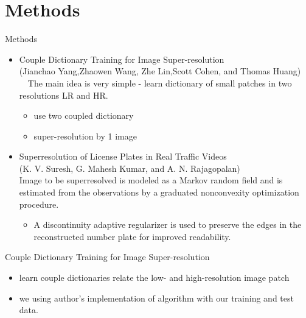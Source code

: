 \section{Methods}
\begin{frame}{Methods}
  \begin{itemize}
    \item Couple Dictionary Training for Image Super-resolution \\
        (Jianchao Yang,Zhaowen Wang, Zhe Lin,Scott Cohen, and Thomas Huang) \\
  The main idea is very simple - learn dictionary of small patches in two resolutions LR and HR.
      \begin{itemize}
        \item use two coupled dictionary
        \item super-resolution by 1 image
      \end{itemize}
    \item Superresolution of License Plates in Real Traffic Videos \\
      (K. V. Suresh, G. Mahesh Kumar, and A. N. Rajagopalan) \\
      Image to be superresolved is modeled as a Markov random field and is estimated from the observations by a graduated
nonconvexity optimization procedure.
      \begin{itemize}
        \item A discontinuity adaptive regularizer is used to preserve the
edges in the reconstructed number plate for improved readability.
      \end{itemize}
  \end{itemize}
\end{frame}

\begin{frame}{Couple Dictionary Training for Image Super-resolution}
  \begin{itemize}
    \item learn couple dictionaries relate the low- and high-resolution image patch

    \item we using author's implementation of algorithm with our training and test data.

  \end{itemize}
\end{frame}

